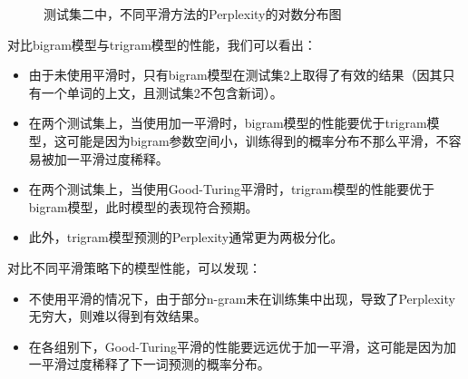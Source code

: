 \documentclass[twoside,11pt]{article}
\begin{document}
\begin{figure}[htbp]    %
  \centering            %
  \caption{测试集二中，不同平滑方法的Perplexity的对数分布图}    %
  \label{fig:figs}    %
\end{figure}


对比bigram模型与trigram模型的性能，我们可以看出：
\begin{itemize}
  \item 由于未使用平滑时，只有bigram模型在测试集2上取得了有效的结果（因其只有一个单词的上文，且测试集2不包含新词）。
  \item 在两个测试集上，当使用加一平滑时，bigram模型的性能要优于trigram模型，这可能是因为bigram参数空间小，训练得到的概率分布不那么平滑，不容易被加一平滑过度稀释。
  \item 在两个测试集上，当使用Good-Turing平滑时，trigram模型的性能要优于bigram模型，此时模型的表现符合预期。
  \item 此外，trigram模型预测的Perplexity通常更为两极分化。
\end{itemize}

对比不同平滑策略下的模型性能，可以发现：
\begin{itemize}
  \item 不使用平滑的情况下，由于部分n-gram未在训练集中出现，导致了Perplexity无穷大，则难以得到有效结果。
  \item 在各组别下，Good-Turing平滑的性能要远远优于加一平滑，这可能是因为加一平滑过度稀释了下一词预测的概率分布。
\end{itemize}
\end{document}
